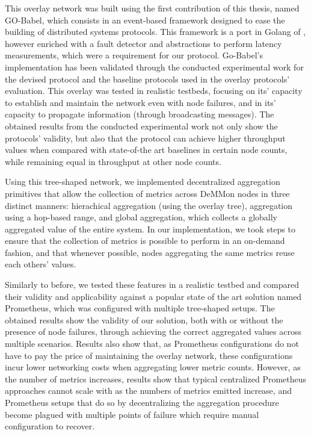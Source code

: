 This overlay network was built using the first contribution of this thesis, named GO-Babel, which consists in an event-based framework designed to ease the building of distributed systems protocols. This framework is a port in Golang of , however enriched with a fault detector and abstractions to perform latency measurements, which were a requirement for our protocol. Go-Babel's implementation has been validated through the conducted experimental work  for the devised protocol and the baseline protocols used in the overlay protocols' evaluation. This overlay was tested in realistic testbeds, focusing on its’ capacity to establish and maintain the network even with node failures, and in its' capacity to propagate information (through broadcasting messages). The obtained results from the conducted experimental work not only show the protocols' validity, but also that the protocol can achieve higher throughput values when compared with state-of-the art baselines in certain node counts, while remaining equal in throughput at other node counts.

Using this tree-shaped network, we implemented decentralized aggregation primitives that allow the collection of metrics across DeMMon nodes in three distinct manners: hierachical aggregation (using the overlay tree), aggregation using a hop-based range, and global aggregation, which collects a globally aggregated value of the entire system. In our implementation, we took steps to ensure that the collection of metrics is possible to perform in an on-demand fashion, and that whenever possible, nodes aggregating the same metrics reuse each others' values.

Similarly to before, we tested these features in a realistic testbed and compared their validity and applicability against a popular state of the art solution named Prometheus, which was configured with multiple tree-shaped setups. The obtained results show the validity of our solution, both with or without the presence of node failures, through achieving the correct aggregated values across multiple scenarios. Results also show that, as Prometheus configurations do not have to pay the price of maintaining the overlay network, these configurations incur lower networking costs when aggregating lower metric counts. However, as the number of metrics increases, results show that typical centralized Prometheus approaches cannot scale with as the numbers of metrics emitted increase, and Prometheus setups that do so by decentralizing the aggregation procedure become plagued with multiple points of failure which require manual configuration to recover. 

